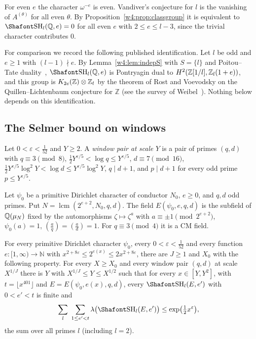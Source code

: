 For even $e$ the character $\omega^{-e}$ is even. Vandiver's conjecture for $l$ is the vanishing of $A^{(\theta)}$ for all even $\theta$. By Proposition~\ref{w4:prop:classgroup} it is equivalent to $\Sha_l(\mathbb Q,e)=0$ for all even $e$ with $2\le e\le l-3$, since the trivial character contributes $0$.

For comparison we record the following published identification. Let $l$ be odd and $e\ge1$ with $(l-1)\nmid e$. By Lemma~\ref{w4:lem:indepS} with $S=\{l\}$ and Poitou--Tate duality~\cite[Theorem~I.4.10]{milneADT}, $\Sha_l(\mathbb Q,e)$ is Pontryagin dual to $H^2(\mathbb Z[1/l],\mathbb Z_l(1+e))$, and this group is $K_{2e}(\mathbb Z)\otimes\mathbb Z_l$ by the theorem of Rost and Voevodsky on the Quillen--Lichtenbaum conjecture for $\mathbb Z$ (see the survey of Weibel~\cite{weibelK}). Nothing below depends on this identification.

\subsection{The Selmer bound on windows}\label{tw:sec:vwin}

\begin{definition}\label{w4:def:winpair}
Let $0<\varepsilon<\frac1{52}$ and $Y\ge2$. A \emph{window pair at scale $Y$} is a pair of primes $(q,d)$ with $q\equiv3\pmod8$, $\frac12Y^{\varepsilon/5}<\log q\le Y^{\varepsilon/5}$, $d\equiv7\pmod{16}$, $\frac12Y^{\varepsilon/5}\log^2Y<\log d\le Y^{\varepsilon/5}\log^2Y$, $q\mid d+1$, and $p\mid d+1$ for every odd prime $p\le Y^{\varepsilon/5}$.
\end{definition}

\begin{definition}\label{w4:def:chifield}
Let $\psi_0$ be a primitive Dirichlet character of conductor $N_0$, $e\ge0$, and $q,d$ odd primes. Put $N=\operatorname{lcm}(2^{e+2},N_0,q,d)$. The field $E(\psi_0,e,q,d)$ is the subfield of $\mathbb Q(\mu_N)$ fixed by the automorphisms $\zeta\mapsto\zeta^a$ with $a\equiv\pm1\pmod{2^{e+2}}$, $\psi_0(a)=1$, $\left(\frac aq\right)=\left(\frac ad\right)=1$. For $q\equiv3\pmod4$ it is a CM field.
\end{definition}

\begin{hypothesis}\label{w4:thm:vwin}
For every primitive Dirichlet character $\psi_0$, every $0<\varepsilon<\frac1{52}$ and every function $e\colon[1,\infty)\to\mathbb N$ with $x^{2+8\varepsilon}\le2^{e(x)}\le2x^{2+8\varepsilon}$, there are $J\ge1$ and $X_0$ with the following property. For every $X\ge X_0$ and every window pair $(q,d)$ at scale $X^{1/J}$ there is $Y$ with $X^{1/J}\le Y\le X^{1/2}$ such that for every $x\in[Y,Y^2]$, with $t=\lfloor x^{401}\rfloor$ and $E=E(\psi_0,e(x),q,d)$, every $\Sha_l(E,e')$ with $0<e'<t$ is finite and
\[
\sum_{l}\ \sum_{1\le e'<t}\lambda\bigl(\Sha_l(E,e')\bigr)\le\exp\bigl(\tfrac12x^{\varepsilon}\bigr),
\]
the sum over all primes $l$ (including $l=2$).
\end{hypothesis}

